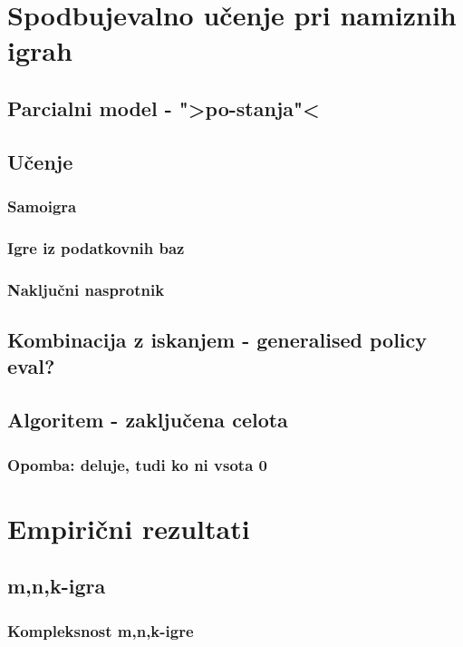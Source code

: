 \documentclass[12pt,a4paper]{amsart}
\theoremstyle{definition} %
\theoremstyle{plain} %
\begin{document}
\section{Spodbujevalno učenje pri namiznih igrah}

\subsection{Parcialni model - ">po-stanja"<}

\subsection{Učenje}
\subsubsection{Samoigra}
\subsubsection{Igre iz podatkovnih baz}
\subsubsection{Naključni nasprotnik}

\subsection{Kombinacija z iskanjem - generalised policy eval?}

\subsection{Algoritem - zaključena celota}
\subsubsection{Opomba: deluje, tudi ko ni vsota 0}


\section{Empirični rezultati}

\subsection{m,n,k-igra}
\subsubsection{Kompleksnost m,n,k-igre}
\end{document}
